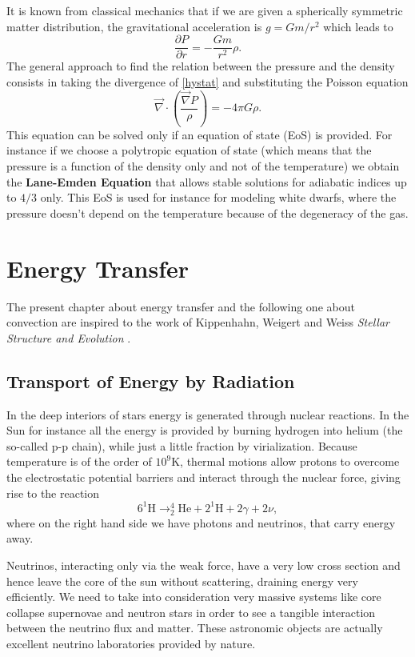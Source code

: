 It is known from classical mechanics that if we are given a spherically symmetric matter distribution, the gravitational acceleration is $g=Gm/r^2$ which leads to
\begin{equation}\label{HydroEquilibrium}
	\frac{\partial P}{\partial r}= - \frac{G m}{r^2} \rho.
\end{equation}
The general approach to find the relation between the pressure and the density consists in taking the divergence of \ref{hystat} and substituting the Poisson equation 
$$
\vec \nabla \cdot \left ( \frac{\vec \nabla P}{\rho} \right ) = - 4 \pi G \rho .
$$
This equation can be solved only if an equation of state (EoS) is provided. For instance if we choose a polytropic equation of state (which means that the pressure is a function of the density only and not of the temperature) we obtain the \textbf{Lane-Emden Equation} that allows stable solutions for adiabatic indices up to $4/3$ only. This EoS is used for instance for modeling white dwarfs, where the pressure doesn't depend on the temperature because of the degeneracy of the gas. 

\section{Energy Transfer}
	The present chapter about energy transfer and the following one about convection are inspired to the work of Kippenhahn, Weigert and Weiss \textit{Stellar Structure and Evolution} \citet{stellarstruc}.
\subsection{Transport of Energy by Radiation}
In the deep interiors of stars energy is generated through nuclear reactions. In the Sun for instance all the energy is provided by burning hydrogen into helium (the so-called p-p chain), while just a little fraction by virialization. Because temperature is of the order of $10^9 \mathrm{K}$, thermal motions allow protons to overcome the electrostatic potential barriers and interact through the nuclear force, giving rise to the reaction
\begin{equation}\label{ppchain}
	6 ^1\mathrm{H} \to ^4_2\mathrm{He} + 2 ^1\mathrm{H} + 2 \gamma + 2 \nu,
\end{equation}
where on the right hand side we have photons and neutrinos, that carry energy away. 

Neutrinos, interacting only via the weak force, have a very low cross section and hence leave the core of the sun without scattering, draining energy very efficiently. We need to take into consideration very massive systems like core collapse supernovae and neutron stars in order to see a tangible interaction between the neutrino flux and matter. These astronomic objects are actually excellent neutrino laboratories provided by nature. 

